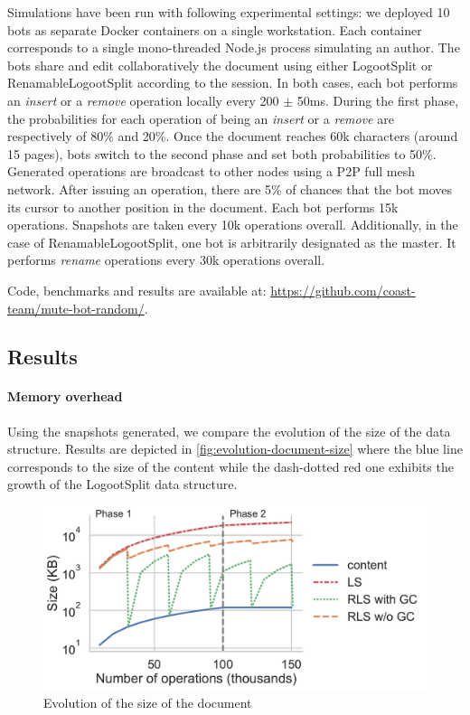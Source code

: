 \documentclass[sigplan,10pt,authorversion]{acmart}
\begin{document}
Simulations have been run with following experimental settings: we deployed 10 bots as separate Docker containers on a single workstation.
Each container corresponds to a single mono-threaded Node.js process simulating an author.
The bots share and edit collaboratively the document using either LogootSplit or RenamableLogootSplit according to the session.
In both cases, each bot performs an \emph{insert} or a \emph{remove} operation locally every 200 $\pm$ 50ms.
During the first phase, the probabilities for each operation of being an \emph{insert} or a \emph{remove} are respectively of 80\% and 20\%.
Once the document reaches 60k characters (around 15 pages), bots switch to the second phase and set both probabilities to 50\%.
Generated operations are broadcast to other nodes using a \ac{P2P} full mesh network.
After issuing an operation, there are 5\% of chances that the bot moves its cursor to another position in the document.
Each bot performs 15k operations.
Snapshots are taken every 10k operations overall.
Additionally, in the case of RenamableLogootSplit, one bot is arbitrarily designated as the master.
It performs \emph{rename} operations every 30k operations overall.

Code, benchmarks and results are available at: \url{https://github.com/coast-team/mute-bot-random/}.

\subsection{Results}

\paragraph{Memory overhead}

Using the snapshots generated, we compare the evolution of the size of the data structure.
Results are depicted in \autoref{fig:evolution-document-size} where the blue line corresponds to the size of the content while the dash-dotted red one exhibits the growth of the LogootSplit data structure.

\begin{figure}[ht!]
    \centering
    \includegraphics[width=\columnwidth]{img/snapshots-sizes.pdf}
    \caption{Evolution of the size of the document}
    \label{fig:evolution-document-size}
\end{figure}
\end{document}
